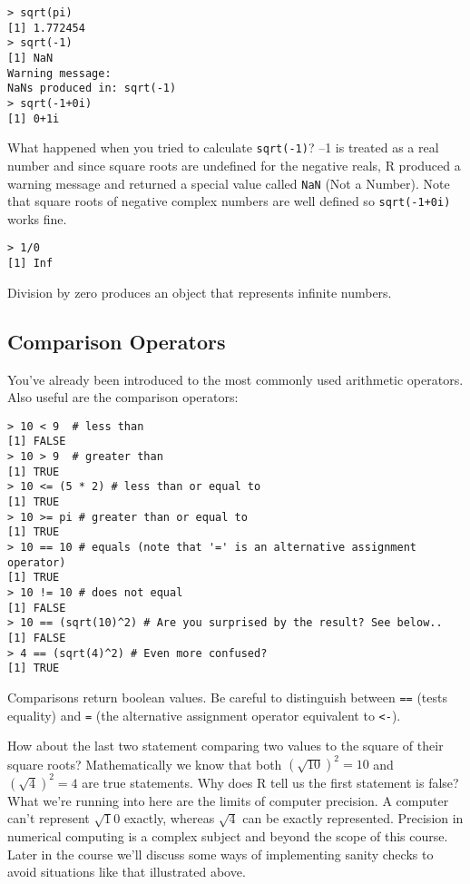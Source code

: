 \begin{lstlisting}
> sqrt(pi)
[1] 1.772454
> sqrt(-1)
[1] NaN
Warning message:
NaNs produced in: sqrt(-1) 
> sqrt(-1+0i)
[1] 0+1i
\end{lstlisting}
What happened when you tried to calculate \lstinline!sqrt(-1)!? --1 is
treated as a real number and since square roots are undefined for the
negative reals, R produced a warning message and returned a special
value called \lstinline!NaN! (Not a Number). Note that square roots of
negative complex numbers are well defined so \lstinline!sqrt(-1+0i)!
works fine.

\begin{lstlisting}
> 1/0
[1] Inf
\end{lstlisting}
Division by zero produces an object that represents infinite numbers.

\subsection{Comparison Operators}

You've already been introduced to the most commonly used arithmetic
operators. Also useful are the comparison operators:

\begin{lstlisting}
> 10 < 9  # less than
[1] FALSE
> 10 > 9  # greater than
[1] TRUE
> 10 <= (5 * 2) # less than or equal to
[1] TRUE
> 10 >= pi # greater than or equal to
[1] TRUE
> 10 == 10 # equals (note that '=' is an alternative assignment operator)
[1] TRUE
> 10 != 10 # does not equal
[1] FALSE
> 10 == (sqrt(10)^2) # Are you surprised by the result? See below..
[1] FALSE
> 4 == (sqrt(4)^2) # Even more confused?
[1] TRUE
\end{lstlisting}
Comparisons return boolean values. Be careful to distinguish between
\lstinline!==! (tests equality) and \lstinline!=! (the alternative
assignment operator equivalent to \lstinline!<-!).

How about the last two statement comparing two values to the square of
their square roots? Mathematically we know that both
$(\sqrt{10})^2 = 10$ and $(\sqrt{4})^2 = 4$ are true statements. Why
does R tell us the first statement is false? What we're running into
here are the limits of computer precision. A computer can't represent
$\sqrt 10$ exactly, whereas $\sqrt 4$ can be exactly represented.
Precision in numerical computing is a complex subject and beyond the
scope of this course. Later in the course we'll discuss some ways of
implementing sanity checks to avoid situations like that illustrated
above.

